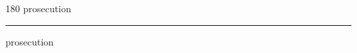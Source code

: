
\begin{frame}
\begin{center}
\begin{turn}{180}
{\fontsize{2.5cm}{1em}\selectfont prosecution}
\end{turn}
\vspace{1em}\par  
\hrule
\vspace{1em}\par  
{\fontsize{2.5cm}{1em}\selectfont prosecution}
\end{center}
\end{frame}
